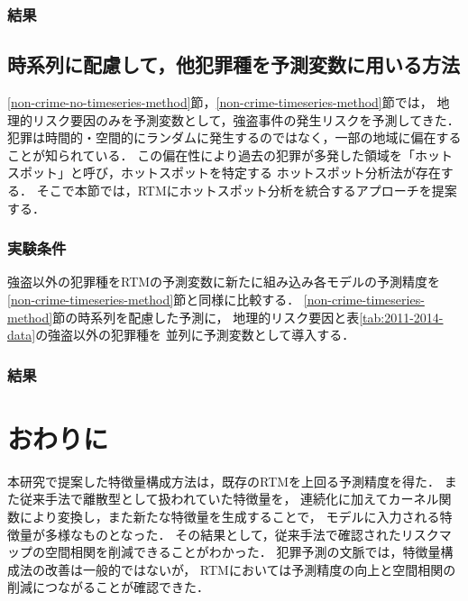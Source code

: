 \documentclass[12pt,a4paper,oneside]{jsbook}
\theoremstyle{plain}
\begin{document}
\subsection{結果}
% 
\section{時系列に配慮して，他犯罪種を予測変数に用いる方法}
\ref{non-crime-no-timeseries-method}節，\ref{non-crime-timeseries-method}節では，
地理的リスク要因のみを予測変数として，強盗事件の発生リスクを予測してきた．
犯罪は時間的・空間的にランダムに発生するのではなく，一部の地域に偏在することが知られている．
この偏在性により過去の犯罪が多発した領域を「ホットスポット」と呼び，ホットスポットを特定する
ホットスポット分析法が存在する．\citep{犯罪予測}
そこで本節では，RTMにホットスポット分析を統合するアプローチを提案する．

\subsection{実験条件}
強盗以外の犯罪種をRTMの予測変数に新たに組み込み各モデルの予測精度を
\ref{non-crime-timeseries-method}節と同様に比較する．
\ref{non-crime-timeseries-method}節の時系列を配慮した予測に，
地理的リスク要因と表\ref{tab:2011-2014-data}の強盗以外の犯罪種を
並列に予測変数として導入する．
\subsection{結果}

\chapter{おわりに}
本研究で提案した特徴量構成方法は，既存のRTMを上回る予測精度を得た．
また従来手法で離散型として扱われていた特徴量を，
連続化に加えてカーネル関数により変換し，また新たな特徴量を生成することで，
モデルに入力される特徴量が多様なものとなった．
その結果として，従来手法で確認されたリスクマップの空間相関を削減できることがわかった．
犯罪予測の文脈では，特徴量構成法の改善は一般的ではないが，
RTMにおいては予測精度の向上と空間相関の削減につながることが確認できた．
\end{document}
